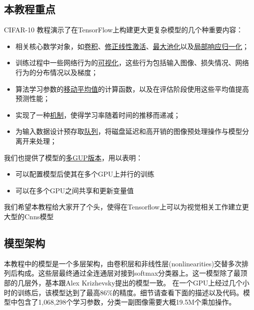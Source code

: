 {\subsection{本教程重点}
CIFAR-10 教程演示了在TensorFlow上构建更大更复杂模型的几个种重要内容：
\begin{itemize}
\item 相关核心数学对象，如\href{https://www.tensorflow.org/api_docs/python/tf/nn/conv2d}{卷积}、\href{https://www.tensorflow.org/api_docs/python/tf/nn/relu}{修正线性激活}、\href{https://www.tensorflow.org/api_docs/python/tf/nn/max_pool}{最大池化}以及\href{https://www.tensorflow.org/api_docs/python/tf/nn/local_response_normalization}{局部响应归一化}；
\item 训练过程中一些网络行为的\href{https://www.tensorflow.org/get_started/summaries_and_tensorboard}{可视化}，这些行为包括输入图像、损失情况、网络行为的分布情况以及梯度；
\item 算法学习参数的\href{https://www.tensorflow.org/api_docs/python/tf/train/ExponentialMovingAverage}{移动平均值}的计算函数，以及在评估阶段使用这些平均值提高预测性能；
\item 实现了一种\href{https://www.tensorflow.org/api_docs/python/tf/train/exponential_decay}{机制}，使得学习率随着时间的推移而递减；
\item 为输入数据设计预存取\href{https://www.tensorflow.org/api_docs/python/tf/train/shuffle_batch}{队列}，将磁盘延迟和高开销的图像预处理操作与模型分离开来处理；
\end{itemize}
我们也提供了模型的\href{https://www.tensorflow.org/tutorials/deep_cnn#training_a_model_using_multiple_gpu_cards}{多GUP版本}，用以表明：
\begin{itemize}
\item 可以配置模型后使其在多个GPU上并行的训练
\item 可以在多个GPU之间共享和更新变量值
\end{itemize}
我们希望本教程给大家开了个头，使得在Tensorflow上可以为视觉相关工作建立更大型的Cnns模型
\subsection{模型架构}
本教程中的模型是一个多层架构，由卷积层和非线性层(nonlinearities)交替多次排列后构成。这些层最终通过全连通层对接到softmax分类器上。这一模型除了最顶部的几层外，基本跟Alex Krizhevsky提出的模型一致。
在一个GPU上经过几个小时的训练后，该模型达到了最高86\%的精度。细节请查看下面的描述以及代码。模型中包含了1,068,298个学习参数，分类一副图像需要大概19.5M个乘加操作。
}

